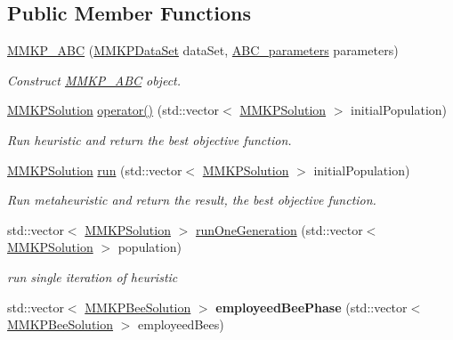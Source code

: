 \subsection*{Public Member Functions}
\begin{DoxyCompactItemize}
\item 
\hyperlink{class_m_m_k_p___a_b_c_a4dabcc8155d17c5ddc984dfd1307b4d0}{M\+M\+K\+P\+\_\+\+A\+B\+C} (\hyperlink{class_m_m_k_p_data_set}{M\+M\+K\+P\+Data\+Set} data\+Set, \hyperlink{class_a_b_c__parameters}{A\+B\+C\+\_\+parameters} parameters)
\begin{DoxyCompactList}\small\item\em Construct \hyperlink{class_m_m_k_p___a_b_c}{M\+M\+K\+P\+\_\+\+A\+B\+C} object. \end{DoxyCompactList}\item 
\hyperlink{class_m_m_k_p_solution}{M\+M\+K\+P\+Solution} \hyperlink{class_m_m_k_p___a_b_c_ad7777f81bbb05359ea884d7cd57df0f7}{operator()} (std\+::vector$<$ \hyperlink{class_m_m_k_p_solution}{M\+M\+K\+P\+Solution} $>$ initial\+Population)
\begin{DoxyCompactList}\small\item\em Run heuristic and return the best objective function. \end{DoxyCompactList}\item 
\hypertarget{class_m_m_k_p___a_b_c_afb60fe316bf761a5cc2a068fab9a15d1}{\hyperlink{class_m_m_k_p_solution}{M\+M\+K\+P\+Solution} \hyperlink{class_m_m_k_p___a_b_c_afb60fe316bf761a5cc2a068fab9a15d1}{run} (std\+::vector$<$ \hyperlink{class_m_m_k_p_solution}{M\+M\+K\+P\+Solution} $>$ initial\+Population)}\label{class_m_m_k_p___a_b_c_afb60fe316bf761a5cc2a068fab9a15d1}

\begin{DoxyCompactList}\small\item\em Run metaheuristic and return the result, the best objective function. \end{DoxyCompactList}\item 
\hypertarget{class_m_m_k_p___a_b_c_a3f405cbe0f90959d1f55bea4211476d4}{std\+::vector$<$ \hyperlink{class_m_m_k_p_solution}{M\+M\+K\+P\+Solution} $>$ \hyperlink{class_m_m_k_p___a_b_c_a3f405cbe0f90959d1f55bea4211476d4}{run\+One\+Generation} (std\+::vector$<$ \hyperlink{class_m_m_k_p_solution}{M\+M\+K\+P\+Solution} $>$ population)}\label{class_m_m_k_p___a_b_c_a3f405cbe0f90959d1f55bea4211476d4}

\begin{DoxyCompactList}\small\item\em run single iteration of heuristic \end{DoxyCompactList}\item 
\hypertarget{class_m_m_k_p___a_b_c_af4c67bc91937841cb32510de2e10ba84}{std\+::vector$<$ \hyperlink{struct_m_m_k_p_bee_solution}{M\+M\+K\+P\+Bee\+Solution} $>$ {\bfseries employeed\+Bee\+Phase} (std\+::vector$<$ \hyperlink{struct_m_m_k_p_bee_solution}{M\+M\+K\+P\+Bee\+Solution} $>$ employeed\+Bees)}\label{class_m_m_k_p___a_b_c_af4c67bc91937841cb32510de2e10ba84}


\end{DoxyCompactItemize}
